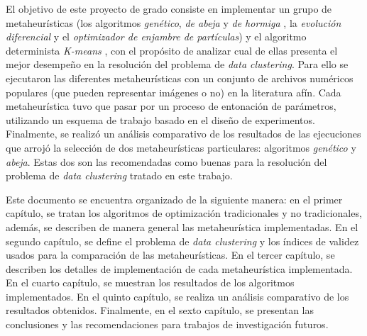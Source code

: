     El objetivo de este proyecto de grado consiste en implementar un grupo de
metaheurísticas (los algoritmos \emph{genético}\cite{DoGeGr2007}, \emph{de abeja}
\cite{BEE_0} y \emph{de hormiga} \cite{OuBa2007}, la \emph{evolución diferencial}
\cite{SwAjAm2008} y el \emph{optimizador de enjambre de partículas}\cite{PSO_0})
y el algoritmo determinista \emph{K-means} \cite{GePo2010}, con el propósito de
analizar cual de ellas presenta el mejor desempeño en la resolución del problema
de \emph{data clustering}. Para ello se ejecutaron las diferentes metaheurísticas
con un conjunto de archivos numéricos populares (que pueden representar imágenes
o no) en la literatura afín. Cada metaheurística tuvo que pasar por un proceso de
entonación de parámetros, utilizando un esquema de trabajo basado en el diseño
de experimentos. Finalmente, se realizó un análisis comparativo de los resultados
de las ejecuciones que arrojó la selección de dos metaheurísticas particulares:
algoritmos \emph{genético} y \emph{abeja}. Estas dos son las recomendadas como
buenas para la resolución del problema de \emph{data clustering} tratado en este
trabajo.

    Este documento se encuentra organizado de la siguiente manera: en el primer
capítulo, se tratan los algoritmos de optimización tradicionales y no tradicionales,
además, se describen de manera general las metaheurística implementadas. En el
segundo capítulo, se define el problema de \emph{data clustering} y los índices
de validez usados para la comparación de las metaheurísticas. En el tercer
capítulo, se describen los detalles de implementación de cada metaheurística
implementada. En el cuarto capítulo, se muestran los resultados de los algoritmos
implementados. En el quinto capítulo, se realiza un análisis comparativo de los
resultados obtenidos. Finalmente, en el sexto capítulo, se presentan las
conclusiones y las recomendaciones para trabajos de investigación futuros.

